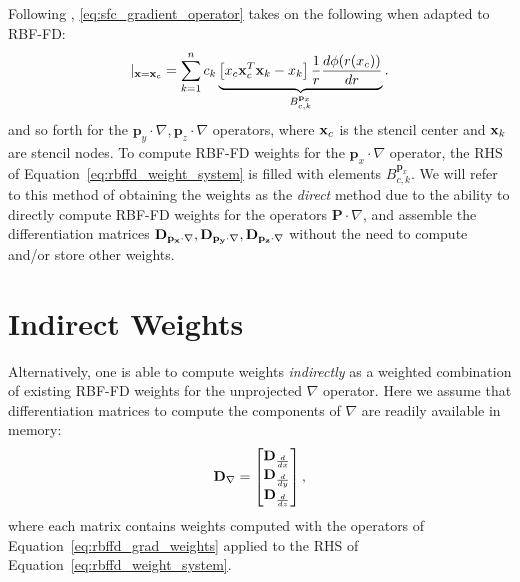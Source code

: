 Following \cite{FlyerLehto11}, \ref{eq:sfc_gradient_operator} takes on the following when adapted to RBF-FD:  
\begin{equation}
[ \mathbf{p}_{x} \cdot \nabla{f(\vx)}] |_{\vx = \vx_{c}} = \sum_{k=1}^{n} c_{k} \underbrace{\left[ x_{c} \vx_{c}^{T} \vx_{k} - x_{k} \right] \frac{1}{r} \d{\phi(r(x_{c}))}{r}}_{B_{c,k}^{\mathbf{p}_{x}}}. 
\label{eq:xsfc_operator_flyer_et_al}
\end{equation}
and so forth for the $\mathbf{p}_{y} \cdot \nabla, \mathbf{p}_{z}  \cdot \nabla$ operators, where $\mathbf{x}_{c}$ is the stencil center and $\mathbf{x}_{k}$ are stencil nodes. To compute RBF-FD weights for the $\mathbf{p}_{x} \cdot \nabla$ operator, the RHS of Equation~\ref{eq:rbffd_weight_system} is filled with elements $B_{c,k}^{\mathbf{p}_{x}}$. We will refer to this method of obtaining the weights as the \emph{direct} method due to the ability to directly compute RBF-FD weights for the operators $\mathbf{P} \cdot \nabla $, and assemble the differentiation matrices $\mathbf{D}_{\mathbf{p_{x}} \cdot \nabla}, \mathbf{D}_{\mathbf{p_{y}} \cdot \nabla}, \mathbf{D}_{\mathbf{p_{z}} \cdot \nabla}$ without the need to compute   and/or store other weights.

\section{Indirect Weights} 


Alternatively, one is able to compute weights \emph{indirectly} as a weighted combination of existing RBF-FD weights for the unprojected $\nabla$ operator. Here we assume that differentiation matrices to compute the components of $\nabla$ are readily available in memory: 
$$
\mathbf{D}_{\nabla} = \begin{bmatrix} \mathbf{D}_{\frac{d }{d x}} \\ \mathbf{D}_{\frac{d }{d y}} \\ \mathbf{D}_{\frac{d }{d z}} \end{bmatrix},
$$
where each matrix contains weights computed with the operators of Equation~\ref{eq:rbffd_grad_weights} applied to the RHS of Equation~\ref{eq:rbffd_weight_system}.  

